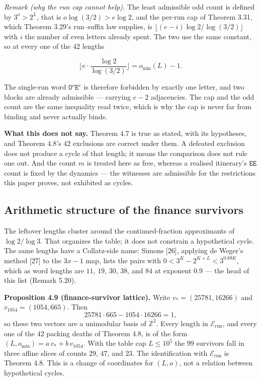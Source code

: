 \documentclass[12pt]{article}
\begin{document}
\emph{Remark (why the run cap cannot help).} The least admissible odd
count is defined by \(3^{o}>2^{L}\), that is \(o\log(3/2)>e\log 2\), and
the per-run cap of Theorem 3.31, which Theorem 3.29's run--suffix law
supplies, is \(\lfloor(e-i)\log 2/\log(3/2)\rfloor\) with \(i\) the
number of even letters already spent. The two use the same constant, so
at every one of the \(42\) lengths

\[
\Big\lfloor e\cdot\frac{\log 2}{\log(3/2)}\Big\rfloor=o_{\min}(L)-1 .
\]

The single-run word \(\mathtt{O}^{o}\mathtt{E}^{e}\) is therefore
forbidden by exactly one letter, and two blocks are already admissible
--- carrying \(e-2\) adjacencies. The cap and the odd count are the same
inequality read twice, which is why the cap is never far from binding
and never actually binds.

\textbf{What this does not say.} Theorem 4.7 is true as stated, with its
hypotheses, and Theorem 4.8's \(42\) exclusions are correct under them.
A defeated exclusion does not produce a cycle of that length; it means
the comparison does not rule one out. And the count \(m\) is treated
here as free, whereas a realised itinerary's \(\mathtt{EE}\) count is
fixed by the dynamics --- the witnesses are admissible for the
restrictions this paper proves, not exhibited as cycles.

\subsection{Arithmetic structure of the finance
survivors}\label{arithmetic-structure-of-the-finance-survivors}

The leftover lengths cluster around the continued-fraction approximants
of \(\log 2/\log 3\). That organizes the table; it does not constrain a
hypothetical cycle. The same lengths have a Collatz-side name: Simons
{[}26{]}, applying de Weger's method {[}27{]} to the \(3x-1\) map, lists
the pairs with \(0<3^K-2^{K+L}<3^{0.89K}\), which as word lengths are
\(11\), \(19\), \(30\), \(38\), and \(84\) at exponent \(0.9\) --- the
head of this list (Remark 5.20).

\textbf{Proposition 4.9 (finance-survivor lattice).} Write
\(v_*=(25781,16266)\) and \(v_{1054}=(1054,665)\). Then \[
25781\cdot 665-1054\cdot 16266=1,
\] so these two vectors are a unimodular basis of \(\mathbb Z^2\). Every
length in \(\mathcal E_{\mathrm{run}}\), and every one of the \(42\)
packing deaths of Theorem 4.8, is of the form
\((L,o_{\min})=a\,v_*+b\,v_{1054}\). With the table cap \(L\le 10^5\)
the \(99\) survivors fall in three affine slices of counts \(29\),
\(47\), and \(23\). The identification with
\(\mathcal E_{\mathrm{run}}\) is Theorem 4.8. This is a change of
coordinates for \((L,o)\), not a relation between hypothetical cycles.
\end{document}
